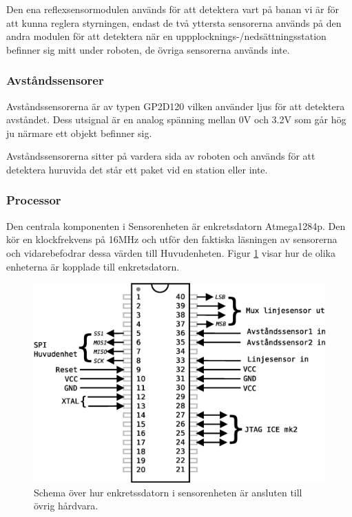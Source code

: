 Den ena reflexsensormodulen används för att detektera vart på banan vi är för att kunna reglera styrningen, endast de två yttersta sensorerna används på den andra modulen för att detektera när en uppplocknings-/nedsättningsstation befinner sig mitt under roboten, de övriga sensorerna används inte.

\subsubsection{Avståndssensorer}
Avståndssensorerna är av typen GP2D120 vilken använder ljus för att detektera avståndet. Dess utsignal är en analog spänning mellan 0V och 3.2V som går hög ju närmare ett objekt befinner sig.

Avståndssensorerna sitter på vardera sida av roboten och används för att detektera huruvida det står ett paket vid en station eller inte.

\subsubsection{Processor}
Den centrala komponenten i Sensorenheten är enkretsdatorn Atmega1284p. Den kör en klockfrekvens på 16MHz och utför den faktiska läsningen av sensorerna och vidarebefodrar dessa värden till Huvudenheten. Figur \ref{sensor-processor} visar hur de olika enheterna är kopplade till enkretsdatorn.

\begin{figure}[h!]
	\centering
	\includegraphics[scale=0.5]{grafik/sensorenhet-processor}
	\caption{Schema över hur enkretssdatorn i sensorenheten är ansluten till övrig hårdvara.} \label{sensor-processor}
\end{figure}


